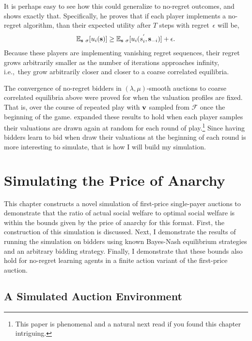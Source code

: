\documentclass[12pt,twoside]{reedthesis}
\begin{document}
It is perhaps easy to see how this could generalize to no-regret outcomes, and \cite{Roughgarden2016} shows exactly that. Specifically, he proves that if each player implements a no-regret algorithm, than their expected utility after $T$ steps with regret~$\epsilon$ will be,
$$ \mathbb{E}_{\textbf{s} ~ \sigma}[u_i(\textbf{s})] \geq \mathbb{E}_{\textbf{s} ~ \sigma}[u_i(s_i^{'}, \textbf{s}_{-i})] + \epsilon.$$
Because these players are implementing vanishing regret sequences, their regret grows arbitrarily smaller as the number of iterations approaches infinity, i.e.,~they grow arbitrarily closer and closer to a coarse correlated equilibria.

The convergence of no-regret bidders in $(\lambda, \mu)$-smooth auctions to coarse correlated equilibria above were proved for when the valuation profiles are fixed. That is, over the course of repeated play with $\textbf{v}$ sampled from $\mathcal{F}$ once the beginning of the game. \cite{Hartline2015} expanded these results to hold when each player samples their valuations are drawn again at random for each round of play.\footnote{This paper is phenomenal and a natural next read if you found this chapter intriguing.} Since having bidders learn to bid when draw their valuations at the beginning of each round is more interesting to simulate, that is how I will build my simulation.
 

\chapter{Simulating the Price of Anarchy}

This chapter constructs a novel simulation of first-price single-payer auctions to demonstrate that the ratio of actual social welfare to optimal social welfare is within the bounds given by the price of anarchy for this format. First, the construction of this simulation is discussed. Next, I demonstrate the results of running the simulation on bidders using known Bayes-Nash equilibrium strategies and an arbitrary bidding strategy. Finally, I demonstrate that these bounds also hold for no-regret learning agents in a finite action variant of the first-price auction.

\section{A Simulated Auction Environment}
\end{document}
